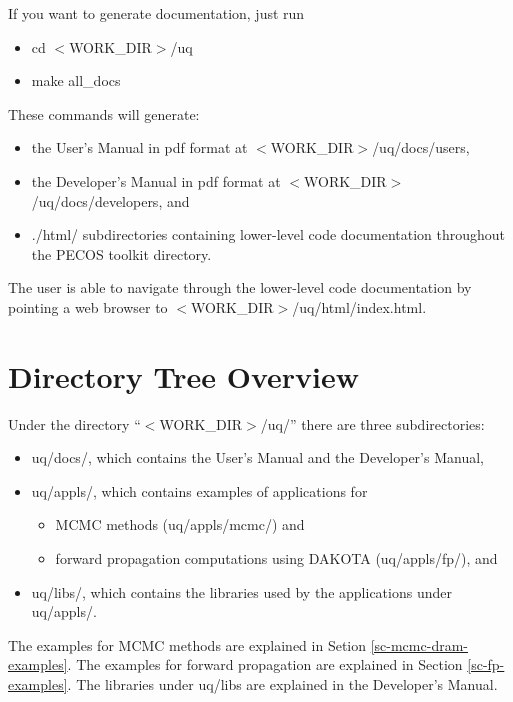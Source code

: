 If you want to generate documentation, just run
\begin{itemize}
\item cd $<$WORK\_DIR$>$/uq
\item make all\_docs
\end{itemize}
These commands will generate:
\begin{itemize}
\item the User's Manual in pdf format at $<$WORK\_DIR$>$/uq/docs/users,
\item the Developer's Manual in pdf format at $<$WORK\_DIR$>$/uq/docs/developers, and
\item ./html/ subdirectories containing lower-level code documentation throughout the PECOS toolkit directory.
\end{itemize}
The user is able to navigate through the lower-level code documentation by pointing a web browser to $<$WORK\_DIR$>$/uq/html/index.html.

\section{Directory Tree Overview}

Under the directory ``$<$WORK\_DIR$>$/uq/'' there are three subdirectories:
\begin{itemize}
\item uq/docs/, which contains the User's Manual and the Developer's Manual,
\item {uq/appls/, which contains examples of applications for
\begin{itemize}
\item MCMC methods (uq/appls/mcmc/) and
\item forward propagation computations using DAKOTA (uq/appls/fp/), and
\end{itemize}
}
\item uq/libs/, which contains the libraries used by the applications under uq/appls/.
\end{itemize}

The examples for MCMC methods are explained in Setion \ref{sc-mcmc-dram-examples}.
The examples for forward propagation are explained in Section \ref{sc-fp-examples}.
The libraries under uq/libs are explained in the Developer's Manual.
